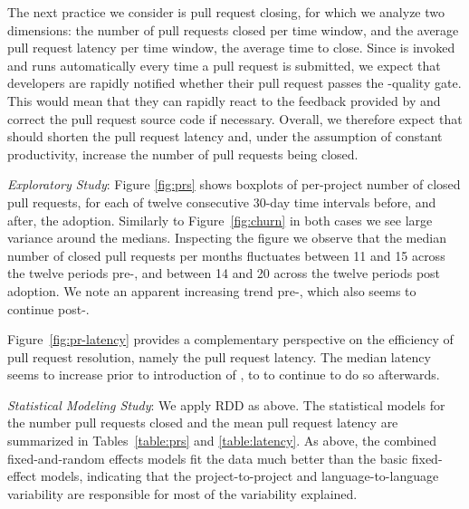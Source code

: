

The next practice we consider is pull request closing, for which we analyze two 
dimensions: the number of pull requests closed per time window, and the average
pull request latency per time window, \ie the average time to close.
Since \Tvis is invoked and runs automatically every time a pull request is submitted, 
we expect that developers are rapidly notified whether their pull request passes the 
\Tvi-quality gate.
This would mean that they can rapidly react to the feedback provided by \Tvi and 
correct the pull request source code if necessary.
Overall, we therefore expect that \Tvis should shorten the pull request latency and, 
under the assumption of constant productivity, increase the number of pull requests 
being closed.

\smallskip\noindent \emph{Exploratory Study}:
Figure
\ref{fig:prs} shows boxplots of per-project number of closed pull requests, for each 
of twelve consecutive 30-day time intervals before, and after, the \Tvis adoption. 
Similarly to Figure~\ref{fig:churn} in both cases we see large variance around the 
medians. 
Inspecting the figure we observe that the median number of closed pull requests 
per months fluctuates between 11 and 15 across the twelve periods pre-\Tvi, and 
between 14 and 20 across the twelve periods post adoption.
We note an apparent increasing trend pre-\Tvi, which also seems to continue post-\Tvi.

Figure~\ref{fig:pr-latency} provides a complementary perspective on the efficiency 
of pull request resolution, namely the pull request latency.
The median latency seems to increase prior to introduction of \Tvis, to to continue
to do so afterwards. %

\smallskip\noindent \emph{Statistical Modeling Study}:
We apply RDD as above. 
The statistical models for the number pull requests closed and the mean pull 
request latency are summarized in Tables~\ref{table:prs} and \ref{table:latency}.
As above, the combined fixed-and-random effects models fit the data much 
better than the basic fixed-effect models, indicating that the project-to-project 
and language-to-language variability are responsible for most of the variability 
explained.

